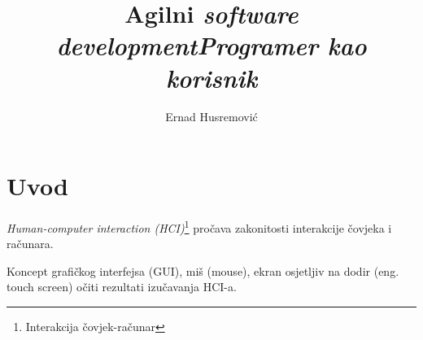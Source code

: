 \documentclass[times, utf8, seminar]{fit}
\begin{document}
\setlength{\parindent}{0pt}


\title{Agilni \emph{software development}\newline \emph{Programer kao korisnik}}









\author{Ernad Husremović}

\maketitle

\tableofcontents

\newpage

%
%


\chapter{Uvod}

\emph{Human-computer interaction (HCI)}\footnote{Interakcija čovjek-računar} pročava zakonitosti interakcije čovjeka i računara.

Koncept grafičkog interfejsa (GUI), miš (mouse), ekran osjetljiv na dodir (eng. touch screen) očiti rezultati izučavanja HCI-a.
\end{document}
